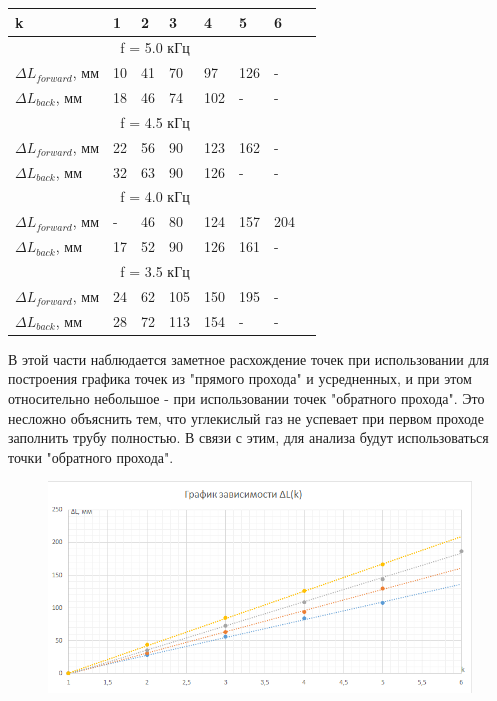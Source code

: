 \documentclass[12pt,a4paper]{article}
\begin{document}
\begin{center}

\begin{tabular}{|p{}|p{}|p{}|p{}|p{}|p{}|p{}|p{}|}
\hline 
k & 1  & 2 & 3 & 4 & 5 & 6 \\ 
\hline 
\multicolumn{7}{|c|}{f = 5.0 кГц} \\ 
\hline 
$\Delta{L_{forward}}$, мм  & 10 & 41 & 70 & 97 & 126 & - \\ 
\hline 
$\Delta{L_{back}}$, мм  & 18 & 46 & 74 & 102 & - & - \\ 
\hline 
\multicolumn{7}{|c|}{f = 4.5 кГц} \\ 
\hline 
$\Delta{L_{forward}}$, мм  & 22 & 56 & 90 & 123 & 162 & - \\ 
\hline 
$\Delta{L_{back}}$, мм  & 32 & 63 & 90 & 126 & - & - \\ 
\hline 
\multicolumn{7}{|c|}{f = 4.0 кГц} \\ 
\hline 
$\Delta{L_{forward}}$, мм  & - & 46 & 80 & 124 & 157 & 204 \\ 
\hline 
$\Delta{L_{back}}$, мм  & 17 & 52 & 90 & 126 & 161 & - \\ 
\hline 
\multicolumn{7}{|c|}{f = 3.5 кГц} \\ 
\hline 
$\Delta{L_{forward}}$, мм  & 24 & 62 & 105 & 150 & 195 & - \\ 
\hline 
$\Delta{L_{back}}$, мм  & 28 & 72 & 113 & 154 & - & - \\ 
\hline 
\end{tabular} 
\end{center}

В этой части наблюдается заметное расхождение точек при использовании для построения графика точек из "прямого прохода" и усредненных, и при этом относительно небольшое - при использовании точек "обратного прохода". Это несложно объяснить тем, что углекислый газ не успевает при первом проходе заполнить трубу полностью. В связи с этим, для анализа будут использоваться точки "обратного прохода".

\begin{figure}[H]
	\begin{center}
		\includegraphics[width=14cm]{2.1.3_gr_2}
	\end{center}
\end{figure}
\end{document}
